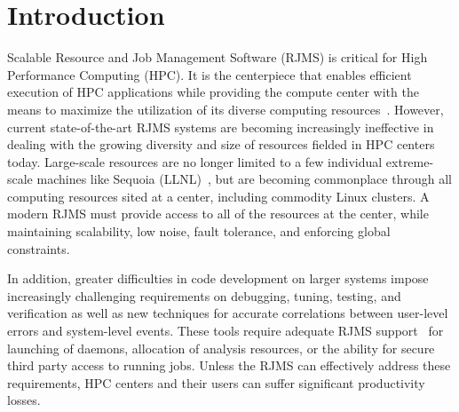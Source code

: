 \section{Introduction}

Scalable Resource and Job Management Software (RJMS) is critical
for High Performance Computing (HPC).
It is the centerpiece that enables efficient
execution of HPC applications while providing
the compute center with the means
to maximize the utilization of its diverse  
 computing resources~\cite{GeorgiouThesis}.
However, current state-of-the-art RJMS systems 
are becoming increasingly
ineffective in dealing with the growing diversity and size 
of resources fielded in HPC centers today. Large-scale 
resources are no longer limited to  
a few individual 
extreme-scale machines like Sequoia (LLNL)~\cite{sequoia}, %
but are becoming commonplace through all computing resources sited at a center, including
commodity Linux clusters.
A modern RJMS must provide access to all of the resources at the center,
while maintaining
scalability, low noise, fault tolerance, and enforcing global constraints.

In addition, greater difficulties in code development
on larger systems impose increasingly challenging
requirements on 
debugging, tuning, testing, and verification
as well as new techniques for 
accurate correlations between user-level errors
and system-level events.
These tools
require adequate RJMS support~\cite{STAT,SPINDLE,PRUNER,SCR,launchmon}
for launching of daemons, allocation of analysis resources, or the ability
for secure third party access to running jobs.
Unless the RJMS can effectively
address these requirements, HPC centers and their users 
can suffer significant productivity losses.

